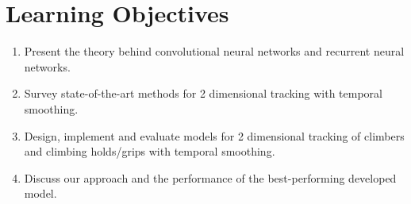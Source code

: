\documentclass[11pt]{article}
\begin{document}
\section{Learning Objectives}
\begin{enumerate}
  \item Present the theory behind convolutional neural networks and recurrent neural networks.
  \item Survey state-of-the-art methods for 2 dimensional tracking with temporal smoothing.
  \item Design, implement and evaluate models for 2 dimensional tracking of climbers and climbing holds/grips with temporal smoothing.
  \item Discuss our approach and the performance of the best-performing developed model.
\end{enumerate}

%
\end{document}

